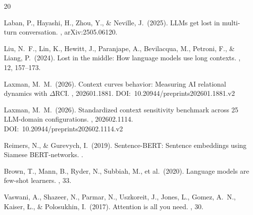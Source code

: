 \documentclass[11pt]{article}
\begin{document}
\begin{thebibliography}{20}

Laban, P., Hayashi, H., Zhou, Y., \& Neville, J.\ (2025).
\newblock LLMs get lost in multi-turn conversation.
, arXiv:2505.06120.

Liu, N.\ F., Lin, K., Hewitt, J., Paranjape, A., Bevilacqua, M., Petroni, F.,
\& Liang, P.\ (2024).
\newblock Lost in the middle: How language models use long contexts.
, 12, 157--173.

Laxman, M.\ M.\ (2026).
\newblock Context curves behavior: Measuring AI relational dynamics with $\Delta$RCI.
, 202601.1881. DOI:~10.20944/preprints202601.1881.v2

Laxman, M.\ M.\ (2026).
\newblock Standardized context sensitivity benchmark across 25 LLM-domain configurations.
, 202602.1114. DOI:~10.20944/preprints202602.1114.v2

Reimers, N., \& Gurevych, I.\ (2019).
\newblock Sentence-BERT: Sentence embeddings using Siamese BERT-networks.
.

Brown, T., Mann, B., Ryder, N., Subbiah, M., et al.\ (2020).
\newblock Language models are few-shot learners.
, 33.

Vaswani, A., Shazeer, N., Parmar, N., Uszkoreit, J., Jones, L., Gomez, A.\ N.,
Kaiser, \L., \& Polosukhin, I.\ (2017).
\newblock Attention is all you need.
, 30.

\end{thebibliography}
\end{document}
